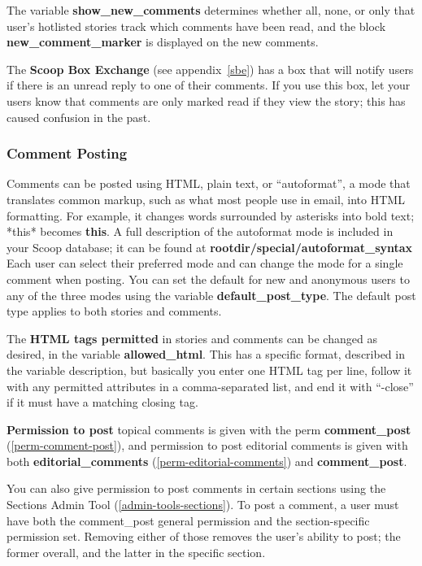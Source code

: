 The variable {\bf show\_new\_comments} determines whether all, none, or only that user's hotlisted stories track which comments have been read, and the block {\bf new\_comment\_marker} is displayed on the new comments.

The {\bf Scoop Box Exchange} (see appendix~\ref{sbe}) has a box that will notify users if there is an unread reply to one of their comments.  If you use this box, let your users know that comments are only marked read if they view the story; this has caused confusion in the past.

\subsubsection{Comment Posting}
\label{comments-post}

Comments can be posted using HTML, plain text, or ``autoformat'', a mode that translates common markup, such as what most people use in email, into HTML formatting. For example, it changes words surrounded by asterisks into bold text; *this* becomes {\bf this}.  A full description of the autoformat mode is included in your Scoop database; it can be found at {\bf \latexhtml{$\vert$}{|}rootdir\latexhtml{$\vert$}{|}/special/autoformat\_syntax}  Each user can select their preferred mode and can change the mode for a single comment when posting.  You can set the default for new and anonymous users to any of the three modes using the variable {\bf default\_post\_type}.  The default post type applies to both stories and comments.

The {\bf HTML tags permitted} in stories and comments can be changed as desired, in the variable {\bf allowed\_html}.  This has a specific format, described in the variable description, but basically you enter one HTML tag per line, follow it with any permitted attributes in a comma-separated list, and end it with ``-close'' if it must have a matching closing tag.

{\bf Permission to post} topical comments is given with the perm {\bf comment\_post} (\ref{perm-comment-post}), and permission to post editorial comments is given with both {\bf editorial\_comments} (\ref{perm-editorial-comments}) and {\bf comment\_post}.  

You can also give permission to post comments in certain sections using the Sections Admin Tool (\ref{admin-tools-sections}).  To post a comment, a user must have both the comment\_post general permission and the section-specific permission set.  Removing either of those removes the user's ability to post; the former overall, and the latter in the specific section.  

